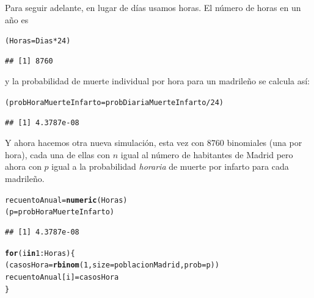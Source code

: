 \documentclass[10pt,a4paper]{article}\usepackage[]{graphicx}\usepackage[]{color}
\makeatletter
\newcommand{\hlnum}[1]{\textcolor[rgb]{0.686,0.059,0.569}{#1}}%
\newcommand{\hlopt}[1]{\textcolor[rgb]{0,0,0}{#1}}%
\newcommand{\hlstd}[1]{\textcolor[rgb]{0.345,0.345,0.345}{#1}}%
\newcommand{\hlkwa}[1]{\textcolor[rgb]{0.161,0.373,0.58}{\textbf{#1}}}%
\newcommand{\hlkwb}[1]{\textcolor[rgb]{0.69,0.353,0.396}{#1}}%
\newcommand{\hlkwc}[1]{\textcolor[rgb]{0.333,0.667,0.333}{#1}}%
\newcommand{\hlkwd}[1]{\textcolor[rgb]{0.737,0.353,0.396}{\textbf{#1}}}%
\newenvironment{kframe}{%
 \def\at@end@of@kframe{}%
 \ifinner\ifhmode%
  \def\at@end@of@kframe{\end{minipage}}%
  \begin{minipage}{\columnwidth}%
 \fi\fi%
 \def\FrameCommand##1{\hskip\@totalleftmargin \hskip-\fboxsep
 \colorbox{shadecolor}{##1}\hskip-\fboxsep
     \hskip-\linewidth \hskip-\@totalleftmargin \hskip\columnwidth}%
 \MakeFramed {\advance\hsize-\width
   \@totalleftmargin\z@ \linewidth\hsize
   \@setminipage}}%
 {\par\unskip\endMakeFramed%
 \at@end@of@kframe}
\newenvironment{knitrout}{}{} %
\makeatother
\begin{document}
Para seguir adelante, en lugar de días usamos horas. El número de horas en un año es
\begin{knitrout}
\color{fgcolor}\begin{kframe}
\begin{alltt}
\hlstd{(Horas} \hlkwb{=} \hlstd{Dias} \hlopt{*} \hlnum{24}\hlstd{)}
\end{alltt}
\begin{verbatim}
## [1] 8760
\end{verbatim}
\end{kframe}
\end{knitrout}
y la probabilidad de muerte individual por hora para un madrileño se calcula así:
\begin{knitrout}
\color{fgcolor}\begin{kframe}
\begin{alltt}
\hlstd{(probHoraMuerteInfarto} \hlkwb{=} \hlstd{probDiariaMuerteInfarto} \hlopt{/} \hlnum{24}\hlstd{)}
\end{alltt}
\begin{verbatim}
## [1] 4.3787e-08
\end{verbatim}
\end{kframe}
\end{knitrout}
Y ahora hacemos otra nueva simulación, esta vez con $8760$ binomiales (una por hora), cada una de ellas con $n$ igual al número de habitantes de Madrid pero ahora con $p$ igual a la probabilidad {\em horaria} de muerte por infarto para cada madrileño.
\begin{knitrout}
\color{fgcolor}\begin{kframe}
\begin{alltt}
\hlstd{recuentoAnual}\hlkwb{=}\hlkwd{numeric}\hlstd{(Horas)}
\hlstd{(p}\hlkwb{=}\hlstd{probHoraMuerteInfarto)}
\end{alltt}
\begin{verbatim}
## [1] 4.3787e-08
\end{verbatim}
\begin{alltt}
\hlkwa{for}\hlstd{(i} \hlkwa{in} \hlnum{1}\hlopt{:}\hlstd{Horas)\{}
  \hlstd{(casosHora}\hlkwb{=}\hlkwd{rbinom}\hlstd{(}\hlnum{1}\hlstd{,}\hlkwc{size}\hlstd{=poblacionMadrid,}\hlkwc{prob}\hlstd{=p))}
  \hlstd{recuentoAnual[i]}\hlkwb{=}\hlstd{casosHora}
\hlstd{\}}
\end{alltt}
\end{kframe}
\end{knitrout}
\end{document}
